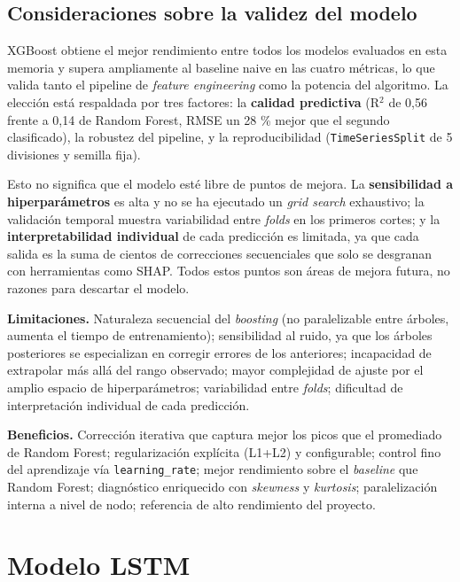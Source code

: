 \documentclass[11pt,a4paper]{article}
\begin{document}
\subsection{Consideraciones sobre la validez del modelo}

XGBoost obtiene el mejor rendimiento entre todos los modelos evaluados en esta memoria y supera ampliamente al baseline naive en las cuatro métricas, lo que valida tanto el pipeline de \textit{feature engineering} como la potencia del algoritmo. La elección está respaldada por tres factores: la \textbf{calidad predictiva} (R$^2$ de 0,56 frente a 0,14 de Random Forest, RMSE un 28 \% mejor que el segundo clasificado), la robustez del pipeline, y la reproducibilidad (\texttt{TimeSeriesSplit} de 5 divisiones y semilla fija).

Esto no significa que el modelo esté libre de puntos de mejora. La \textbf{sensibilidad a hiperparámetros} es alta y no se ha ejecutado un \textit{grid search} exhaustivo; la validación temporal muestra variabilidad entre \textit{folds} en los primeros cortes; y la \textbf{interpretabilidad individual} de cada predicción es limitada, ya que cada salida es la suma de cientos de correcciones secuenciales que solo se desgranan con herramientas como SHAP. Todos estos puntos son áreas de mejora futura, no razones para descartar el modelo.

\textbf{Limitaciones.} Naturaleza secuencial del \textit{boosting} (no paralelizable entre árboles, aumenta el tiempo de entrenamiento); sensibilidad al ruido, ya que los árboles posteriores se especializan en corregir errores de los anteriores; incapacidad de extrapolar más allá del rango observado; mayor complejidad de ajuste por el amplio espacio de hiperparámetros; variabilidad entre \textit{folds}; dificultad de interpretación individual de cada predicción.

\textbf{Beneficios.} Corrección iterativa que captura mejor los picos que el promediado de Random Forest; regularización explícita (L1+L2) y configurable; control fino del aprendizaje vía \texttt{learning\_rate}; mejor rendimiento sobre el \textit{baseline} que Random Forest; diagnóstico enriquecido con \textit{skewness} y \textit{kurtosis}; paralelización interna a nivel de nodo; referencia de alto rendimiento del proyecto.

\section{Modelo LSTM}
\end{document}
